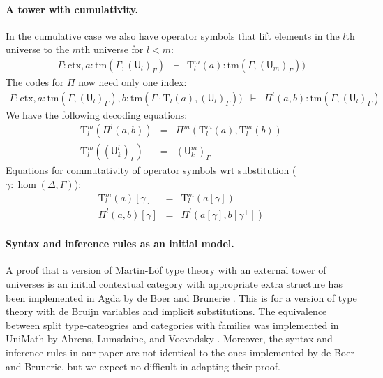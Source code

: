 \documentclass[11pt,a4paper]{article}
\theoremstyle{definition}
\newcommand{\UU}{\mathsf{U}}
\def\UU{\mathsf{U}}
\newcommand{\N}{\mathsf{N}}
\def\Pihat{\Pi}
\newcommand{\ctx}{\mathrm{ctx}}
\newcommand{\tm}{\mathrm{tm}}
\def\U{\mathsf{U}}
\newcommand{\Ta}{\mathrm{T}}
\begin{document}
\paragraph{A tower with cumulativity.}
In the cumulative case we also have operator symbols that lift elements in the $l$th universe to the $m$th universe for $l < m$:
\begin{eqnarray*}
\Gamma : \ctx, a : \tm(\Gamma,(\U_{l})_\Gamma) &\vdash& {\Ta^m_{l}}(a) : \tm(\Gamma,(\U_{m})_\Gamma))
\end{eqnarray*}
The codes for $\Pi$ now need only one index:
\begin{eqnarray*}
\Gamma : \ctx,
a : \tm(\Gamma,(\U_{l})_\Gamma),
b :  \tm(\Gamma \cdot \Ta_{l}(a), (\U_{l})_\Gamma))
&\vdash&
 \Pihat^{l}(a,b) : \tm(\Gamma,(\U_{l})_\Gamma)
\end{eqnarray*}
We have the following decoding equations:
\begin{eqnarray*}
\Ta^m_{l}(\Pi^{l}(a,b)) &=& \Pi^m(\Ta^m_l(a),\Ta^m_l(b))\\
\Ta^m_l((\UU^l_k)_\Gamma) &=& (\UU^m_k)_\Gamma
\end{eqnarray*}
Equations for commutativity of operator symbols wrt substitution ($\gamma : \hom(\Delta,\Gamma)$):
\begin{eqnarray*}
\Ta^m_l(a) [ \gamma ] &=& \Ta^m_l(a[ \gamma ] )\\
\Pi^{l}(a,b)[ \gamma ] &=& \Pi^{l}(a [ \gamma ], b[ \gamma^+ ])
\end{eqnarray*}

\paragraph{Syntax and inference rules as an initial model.} A proof that a version of Martin-Löf type theory with an external tower of universes  is an initial contextual category with appropriate extra structure has been implemented in Agda by de Boer and Brunerie \cite{Brunerie:initiality,deBoer:lic}. This is for a version of type theory with de Bruijn variables and implicit substitutions. The equivalence between split type-cateogries and categories with families was implemented in UniMath by Ahrens, Lumsdaine, and Voevodsky \cite{AhrensLV18}. Moreover, the syntax and inference rules in our paper \cite{BezemCDE22} are not identical to the ones implemented by de Boer and Brunerie, but we expect no difficult in adapting their proof.
\end{document}
